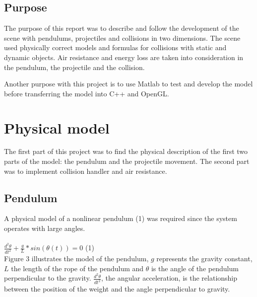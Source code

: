 \documentclass[a4paper,12pt,twoside,english]{article}
\begin{document}
\subsection{Purpose}
The purpose of this report was to describe and follow the development of the scene with pendulums, projectiles and collisions in two dimensions. The scene used physically correct models and formulas for collisions with static and dynamic objects. Air resistance and energy loss are taken into consideration in the pendulum, the projectile and the collision.

Another purpose with this project is to use Matlab to test and develop the model before transferring the model into C++ and OpenGL. 

\section{Physical model}
The first part of this project was to find the physical description of the first two parts of the model: the pendulum and the projectile movement. The second part was to implement collision handler and air resistance. 
\subsection{Pendulum}
A physical model of a nonlinear pendulum (1) was required since the system operates with large angles. \cite{Nor:06} \cite{Hal:10} \\ \\
$\frac{d^2\theta}{dt^2} + \frac{g}{L}*sin(\theta(t)) = 0$ \hfill (1) \\ 
Figure 3 illustrates the model of the pendulum, $g$ represents the gravity constant, $L$ the length of the rope of the pendulum and $\theta$ is the angle of the pendulum perpendicular to the gravity.  $\frac{d^2\theta}{dt^2}$, the angular acceleration, is the relationship between the position of the weight and the angle perpendicular to gravity.
\end{document}

